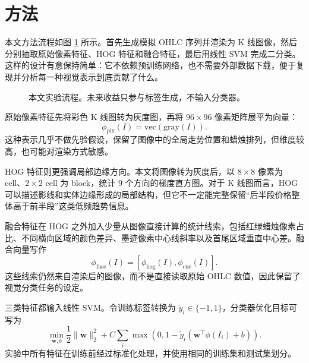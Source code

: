 \documentclass[UTF8,a4paper,11pt,fontset=fandol]{ctexart}
\begin{document}
\section{方法}

本文方法流程如图 \ref{fig:pipeline} 所示。首先生成模拟 OHLC 序列并渲染为 K 线图像，然后分别抽取原始像素特征、HOG 特征和融合特征，最后用线性 SVM 完成二分类。这样的设计有意保持简单：它不依赖预训练网络，也不需要外部数据下载，便于复现并分析每一种视觉表示到底贡献了什么。

\begin{figure}[htbp]
  \centering
  \caption{本文实验流程。未来收益只参与标签生成，不输入分类器。}
  \label{fig:pipeline}
\end{figure}

原始像素特征先将彩色 K 线图转为灰度图，再将 $96\times96$ 像素矩阵展平为向量：
\[
\phi_{\mathrm{pix}}(I)=\mathrm{vec}(\mathrm{gray}(I)).
\]
这种表示几乎不做先验假设，保留了图像中的全局走势位置和蜡烛排列，但维度较高，也可能对渲染方式敏感。

HOG 特征则更强调局部边缘方向。本文将图像转为灰度后，以 $8\times8$ 像素为 cell、$2\times2$ cell 为 block，统计 9 个方向的梯度直方图。对于 K 线图而言，HOG 可以描述影线和实体边缘形成的局部结构，但它不一定能完整保留“后半段价格整体高于前半段”这类低频趋势信息。

融合特征在 HOG 之外加入少量从图像直接计算的统计线索，包括红绿蜡烛像素占比、不同横向区域的颜色差异、墨迹像素中心线斜率以及首尾区域垂直中心差。融合向量写作
\[
\phi_{\mathrm{fuse}}(I)=[\phi_{\mathrm{hog}}(I),\phi_{\mathrm{cue}}(I)].
\]
这些线索仍然来自渲染后的图像，而不是直接读取原始 OHLC 数值，因此保留了视觉分类任务的设定。

三类特征都输入线性 SVM。令训练标签转换为 $\tilde{y}_i\in\{-1,1\}$，分类器优化目标可写为
\[
\min_{\mathbf{w},b}\frac{1}{2}\|\mathbf{w}\|_2^2
+C\sum_i \max(0,1-\tilde{y}_i(\mathbf{w}^{\top}\phi(I_i)+b)).
\]
实验中所有特征在训练前经过标准化处理，并使用相同的训练集和测试集划分。
\end{document}
